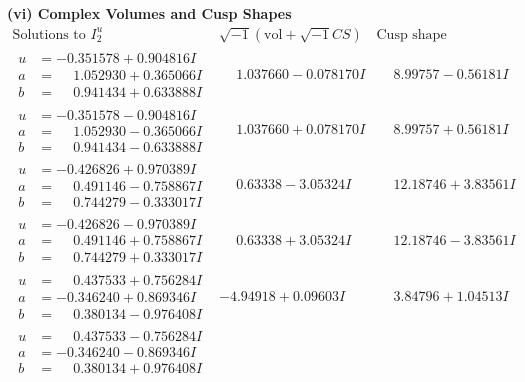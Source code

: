 \documentclass[1p]{elsarticle_modified}
\theoremstyle{definition}
\newcommand{\I}{\sqrt{-1}}
\begin{document}
\newpage\flushleft \textbf{(vi) Complex Volumes and Cusp Shapes}
$$\begin{array}{c|c|c}  
\text{Solutions to }I^u_{2}& \I (\text{vol} + \sqrt{-1}CS) & \text{Cusp shape}\\
 \hline 
\begin{aligned}
u &= -0.351578 + 0.904816 I \\
a &= \phantom{-}1.052930 + 0.365066 I \\
b &= \phantom{-}0.941434 + 0.633888 I\end{aligned}
 & \phantom{-}1.037660 - 0.078170 I & \phantom{-}8.99757 - 0.56181 I \\ \hline\begin{aligned}
u &= -0.351578 - 0.904816 I \\
a &= \phantom{-}1.052930 - 0.365066 I \\
b &= \phantom{-}0.941434 - 0.633888 I\end{aligned}
 & \phantom{-}1.037660 + 0.078170 I & \phantom{-}8.99757 + 0.56181 I \\ \hline\begin{aligned}
u &= -0.426826 + 0.970389 I \\
a &= \phantom{-}0.491146 - 0.758867 I \\
b &= \phantom{-}0.744279 - 0.333017 I\end{aligned}
 & \phantom{-}0.63338 - 3.05324 I & \phantom{-}12.18746 + 3.83561 I \\ \hline\begin{aligned}
u &= -0.426826 - 0.970389 I \\
a &= \phantom{-}0.491146 + 0.758867 I \\
b &= \phantom{-}0.744279 + 0.333017 I\end{aligned}
 & \phantom{-}0.63338 + 3.05324 I & \phantom{-}12.18746 - 3.83561 I \\ \hline\begin{aligned}
u &= \phantom{-}0.437533 + 0.756284 I \\
a &= -0.346240 + 0.869346 I \\
b &= \phantom{-}0.380134 - 0.976408 I\end{aligned}
 & -4.94918 + 0.09603 I & \phantom{-}3.84796 + 1.04513 I \\ \hline\begin{aligned}
u &= \phantom{-}0.437533 - 0.756284 I \\
a &= -0.346240 - 0.869346 I \\
b &= \phantom{-}0.380134 + 0.976408 I\end{aligned}

\end{array}$$
\end{document}
